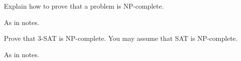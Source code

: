 \begin{questions}
\begin{solution}
\end{solution}


\question
Explain how to prove that a problem is NP-complete.
\begin{solution}
As in notes.
\end{solution}


\question
Prove that 3-SAT is NP-complete. You may assume that SAT is NP-complete.
\begin{solution}
As in notes.
\end{solution}


\end{questions}
